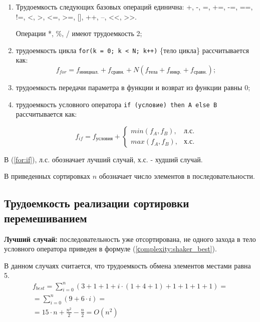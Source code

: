 \begin{enumerate}
	
	\item Трудоемкость следующих базовых операций единична:
	+, -, =, +=, -=, ==, !=, <, >, <=, >=, [], ++, --, <<, >>.
	
	Операции *, \%, / имеют трудоемкость 2;
	
	\item трудоемкость цикла \texttt{for(k = 0; k < N; k++)} \{тело цикла\} рассчитывается как:
	\begin{equation}
		\label{for:for}
		f_{for} = f_{\text{инициал.}} + f_{\text{сравн.}} + N(f_{\text{тела}} + f_{\text{инкр.}} + f_{\text{сравн.}});
	\end{equation}
	
	\item трудоемкость передачи параметра в функции и возврат из функции равны 0;
	\item трудоемкость условного оператора \texttt{if (условие) then A else B} рассчитывается как:
	
	\begin{equation}
		\label{for:if}
		f_{if} = f_{\text{условия}} +
		\begin{cases}
			min(f_A, f_B), & \text{л.с.}\\
			max(f_A, f_B), & \text{х.с.}
		\end{cases}
	\end{equation}
	
\end{enumerate}

В (\ref{for:if}), л.с. обозначает лучший случай, х.с. - худший случай.

В приведенных сортировках $n$ обозначает число элементов в последовательности.
\subsection{Трудоемкость реализации сортировки перемешиванием}
\textbf{Лучший случай:} последовательность уже отсортирована, не одного захода в тело условного оператора приведен в формуле (\ref{сomplexity:shaker_best}).

В данном случаях считается, что трудоемкость обмена элементов местами равна 5.
\begin{equation}
	\label{сomplexity:shaker_best}
	\begin{gathered}
		f_{best} =\sum_{i=0}^{n}  (3 +  1 + 1 + i \cdot (1 +4  + 1) + 1 +1 +1 +1) =\\ =\sum_{i=0}^{n} (9 + 6 \cdot i) = \\
		= 15 \cdot n + \frac{n^2}{2} - \frac{n}{2}  = O(n^2)
	\end{gathered}
\end{equation}

